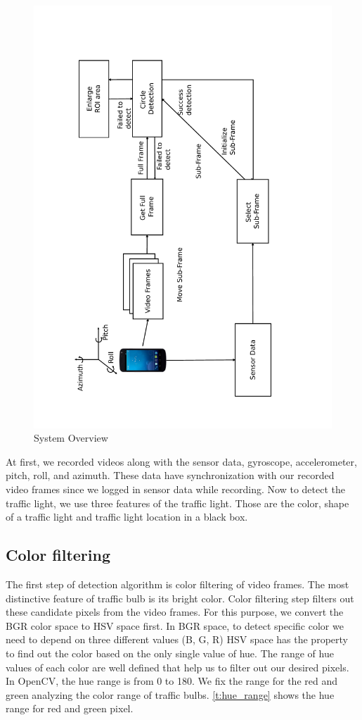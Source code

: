 \begin{figure}
\centering
\includegraphics[width=5.2in]{figures/sysdia.pdf}
\caption{System Overview}
\label{f:sys_dia}
\end{figure}

At first, we recorded videos along with the sensor data, gyroscope, accelerometer, pitch, roll, and azimuth.
These data have synchronization with our recorded video frames since we logged in sensor data while recording.
Now to detect the traffic light, we use three features of the traffic light.
Those are the color, shape of a traffic light and traffic light location in a black box.

\subsection{Color filtering}
The first step of detection algorithm is color filtering of video frames.
The most distinctive feature of traffic bulb is its bright color.
Color filtering step filters out these candidate pixels from the video frames.
For this purpose, we convert the BGR color space to HSV space first.
In BGR space, to detect specific color we need to depend on three different values (B, G, R)
HSV space has the property to find out the color based on the only single value of hue.
The range of hue values of each color are well defined that help us to filter out our desired pixels.
In OpenCV, the hue range is from 0 to 180.
We fix the range for the red and green analyzing the color range of traffic bulbs.
\ref{t:hue_range} shows the hue range for red and green pixel.

